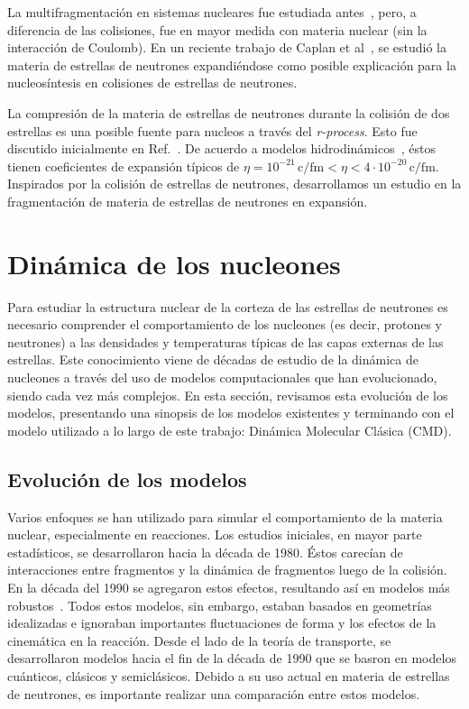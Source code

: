 La multifragmentación en sistemas nucleares fue estudiada
antes~\cite{bonasera_critical_2000, chikazumi_quantum_2001}, pero, a
diferencia de las colisiones, fue en mayor medida con materia nuclear (sin la interacción de Coulomb).
En un reciente trabajo de Caplan et al~\cite{caplan_pasta_2015}, se estudió la materia de estrellas de neutrones expandiéndose como posible explicación para la nucleosíntesis en colisiones de estrellas de neutrones.

La compresión de la materia de estrellas de neutrones durante la colisión de dos estrellas es una posible fuente para nucleos a través del \emph{r-process}.
Esto fue discutido inicialmente en Ref.~\cite{lattimer_black-hole-neutron-star_1974}.
De acuerdo a modelos hidrodinámicos~\cite{goriely_r-process_2011}, éstos tienen coeficientes de expansión típicos de  $\eta = 10^{-21}\,\text{c/fm} < \eta < 4\cdot 10^{-20}\,\text{c/fm}$.
Inspirados por la colisión de estrellas de neutrones, desarrollamos un estudio en la fragmentación de materia de estrellas de neutrones en expansión.

\section{Dinámica de los nucleones}\label{sc:nucleon}
Para estudiar la estructura nuclear de la corteza de las estrellas de neutrones es necesario comprender el comportamiento de los nucleones (es decir, protones y neutrones) a las densidades y temperaturas típicas de las capas externas de las estrellas.
Este conocimiento viene de décadas de estudio de la dinámica de nucleones a través del uso de modelos computacionales que han evolucionado, siendo cada vez más complejos.
En esta sección, revisamos esta evolución de los modelos, presentando una sinopsis de los modelos existentes y terminando con el modelo utilizado a lo largo de este trabajo: Dinámica Molecular Clásica (CMD).

\subsection{Evolución de los modelos}
Varios enfoques se han utilizado para simular el comportamiento de la materia nuclear, especialmente en reacciones.
Los estudios iniciales, en mayor parte estadísticos, se desarrollaron hacia la década de 1980.
Éstos carecían de interacciones entre fragmentos y la dinámica de fragmentos luego de la colisión.
En la década del 1990 se agregaron estos efectos, resultando así en modelos más robustos~\cite{barz_cluster_1996}.
Todos estos modelos, sin embargo, estaban basados en geometrías idealizadas e ignoraban importantes fluctuaciones de forma y los efectos de la cinemática en la reacción.
Desde el lado de la teoría de transporte, se desarrollaron modelos hacia el fin de la década de 1990 que se basron en modelos cuánticos, clásicos y semiclásicos.
Debido a su uso actual en materia de estrellas de neutrones, es importante realizar una comparación entre estos modelos.

